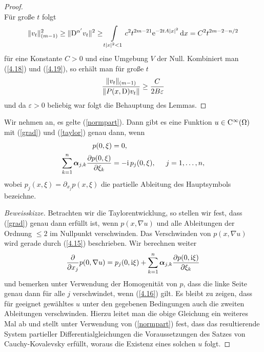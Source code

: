 \begin{proof}
\begin{equation}
\end{equation}
Für große $t$ folgt
\begin{equation}
	\label{4.19}
\lVert v_t \rVert_{(m-1)}^2 \ge \lVert \mathrm D^{\alpha'} v_t\rVert^2 \ge \int\limits_{t|x|^2 < 1}c^2t^{2m-21}\mathrm e^{-2tA|x|^2} \,\mathrm d x = C^2 t^{2m-2-n/2}
\end{equation}
für eine Konstante $C > 0$ und eine Umgebung $V$ der Null. Kombiniert man (\ref{4.18}) und (\ref{4.19}), so erhält man für große $t$
\begin{equation}
\dfrac{\lVert v_t \rVert_{(m-1)}}{\lVert P(x,\mathrm D) v_t \rVert} \ge \dfrac{C}{2B\varepsilon}
\end{equation}
und da $\varepsilon>0$ beliebig war folgt die Behauptung des Lemmas.
\end{proof}

\begin{lem}\label{lem2}
Wir nehmen an, es gelte (\ref{normpart}). Dann gibt es eine Funktion $u \in \mathrm C^\infty(\Omega)$ mit (\ref{grad}) und (\ref{taylor}) genau dann, wenn
\begin{align}
	\label{4.15}
p(0, \xi) &= 0, \\ 	\label{4.16}
\sum_{k=1}^{n} \boldsymbol\alpha_{j,k}\frac{\partial p(0,\xi)}{\partial \xi_k} &= -\mathrm i\,  p_j(0,\xi), \hspace{0.5cm} j=1, \ldots, n, 
\end{align}
wobei $ p_j(x,\xi) = \partial_{x_j}  p(x,\xi)$ die partielle Ableitung des Hauptsymbols bezeichne.
\end{lem}

\begin{proof} [Beweisskizze]
Betrachten wir die Taylorentwicklung, so stellen wir fest, dass (\ref{grad}) genau dann erfüllt ist, wenn $p(x,\nabla u)$ und alle Ableitungen der Ordnung $\le 2$ im Nullpunkt verschwinden. Das Verschwinden von $p(x,\nabla u)$ wird gerade durch (\ref{4.15}) beschrieben. Wir berechnen weiter
\begin{equation}
\dfrac{\partial}{\partial x_j} p(0,\nabla u) = 
p_j(0,\mathrm i\xi) + \sum_{k=1}^{n} \boldsymbol\alpha_{j,k} \dfrac{\partial p(0,\mathrm i\xi)}{\partial \xi_k}
\end{equation}
und bemerken unter Verwendung der Homogenität von $p$, dass die linke Seite genau dann für alle $j$ verschwindet, wenn (\ref{4.16}) gilt. Es bleibt zu zeigen, dass für geeignet gewähltes $u$ unter den gegebenen Bedingungen auch die zweiten Ableitungen verschwinden. Hierzu leitet man die obige Gleichung ein weiteres Mal ab und stellt unter Verwendung von (\ref{normpart}) fest, dass das resultierende System partieller Differentialgleichungen die Voraussetzungen des Satzes von Cauchy-Kovalevsky erfüllt, woraus die Existenz eines solchen $u$ folgt.
\end{proof}

